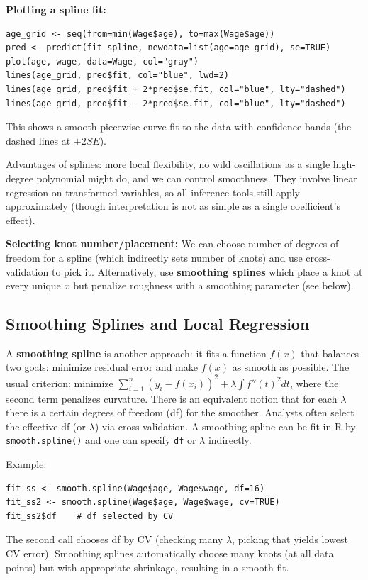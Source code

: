 \documentclass[11pt]{article}
\begin{document}
\textbf{Plotting a spline fit:}
\begin{verbatim}
age_grid <- seq(from=min(Wage$age), to=max(Wage$age))
pred <- predict(fit_spline, newdata=list(age=age_grid), se=TRUE)
plot(age, wage, data=Wage, col="gray")
lines(age_grid, pred$fit, col="blue", lwd=2)
lines(age_grid, pred$fit + 2*pred$se.fit, col="blue", lty="dashed")
lines(age_grid, pred$fit - 2*pred$se.fit, col="blue", lty="dashed")
\end{verbatim}
This shows a smooth piecewise curve fit to the data with confidence bands (the dashed lines at $\pm 2 SE$).

Advantages of splines: more local flexibility, no wild oscillations as a single high-degree polynomial might do, and we can control smoothness. They involve linear regression on transformed variables, so all inference tools still apply approximately (though interpretation is not as simple as a single coefficient's effect).

\textbf{Selecting knot number/placement:} We can choose number of degrees of freedom for a spline (which indirectly sets number of knots) and use cross-validation to pick it. Alternatively, use \textbf{smoothing splines} which place a knot at every unique $x$ but penalize roughness with a smoothing parameter (see below).

\subsection{Smoothing Splines and Local Regression}
A \textbf{smoothing spline} is another approach: it fits a function $f(x)$ that balances two goals: minimize residual error and make $f(x)$ as smooth as possible. The usual criterion: minimize $\sum_{i=1}^n (y_i - f(x_i))^2 + \lambda \int f''(t)^2 dt$, where the second term penalizes curvature. There is an equivalent notion that for each $\lambda$ there is a certain degrees of freedom (df) for the smoother. Analysts often select the effective df (or $\lambda$) via cross-validation. A smoothing spline can be fit in R by \texttt{smooth.spline()} and one can specify \texttt{df} or $\lambda$ indirectly.

Example:
\begin{verbatim}
fit_ss <- smooth.spline(Wage$age, Wage$wage, df=16)
fit_ss2 <- smooth.spline(Wage$age, Wage$wage, cv=TRUE)
fit_ss2$df    # df selected by CV
\end{verbatim}
The second call chooses df by CV (checking many $\lambda$, picking that yields lowest CV error). Smoothing splines automatically choose many knots (at all data points) but with appropriate shrinkage, resulting in a smooth fit.
\end{document}
